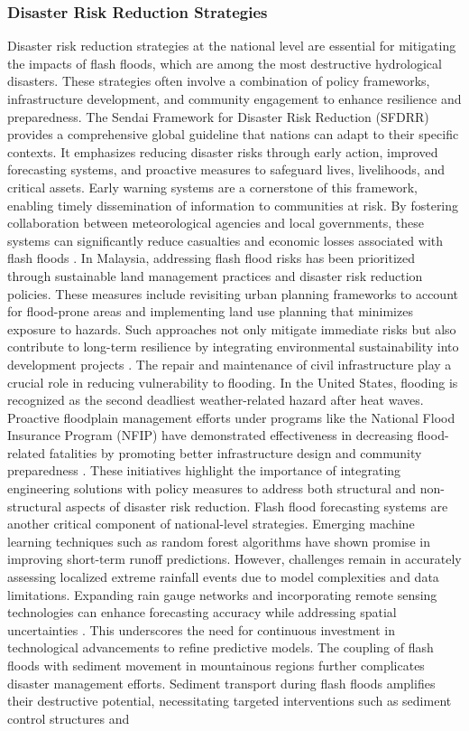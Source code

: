 \subsubsection{Disaster Risk Reduction Strategies}
Disaster risk reduction strategies at the national level are essential for mitigating the impacts of flash floods, which are among the most destructive hydrological disasters. These strategies often involve a combination of policy frameworks, infrastructure development, and community engagement to enhance resilience and preparedness. The Sendai Framework for Disaster Risk Reduction (SFDRR) provides a comprehensive global guideline that nations can adapt to their specific contexts. It emphasizes reducing disaster risks through early action, improved forecasting systems, and proactive measures to safeguard lives, livelihoods, and critical assets. Early warning systems are a cornerstone of this framework, enabling timely dissemination of information to communities at risk. By fostering collaboration between meteorological agencies and local governments, these systems can significantly reduce casualties and economic losses associated with flash floods \citep{Jubach2016}\citep{Munoz2018}. In Malaysia, addressing flash flood risks has been prioritized through sustainable land management practices and disaster risk reduction policies. These measures include revisiting urban planning frameworks to account for flood-prone areas and implementing land use planning that minimizes exposure to hazards. Such approaches not only mitigate immediate risks but also contribute to long-term resilience by integrating environmental sustainability into development projects \citep{Saad2024}. The repair and maintenance of civil infrastructure play a crucial role in reducing vulnerability to flooding. In the United States, flooding is recognized as the second deadliest weather-related hazard after heat waves. Proactive floodplain management efforts under programs like the National Flood Insurance Program (NFIP) have demonstrated effectiveness in decreasing flood-related fatalities by promoting better infrastructure design and community preparedness \citep{Abegaz2024}. These initiatives highlight the importance of integrating engineering solutions with policy measures to address both structural and non-structural aspects of disaster risk reduction. Flash flood forecasting systems are another critical component of national-level strategies. Emerging machine learning techniques such as random forest algorithms have shown promise in improving short-term runoff predictions. However, challenges remain in accurately assessing localized extreme rainfall events due to model complexities and data limitations. Expanding rain gauge networks and incorporating remote sensing technologies can enhance forecasting accuracy while addressing spatial uncertainties \citep{Munoz2018}. This underscores the need for continuous investment in technological advancements to refine predictive models. The coupling of flash floods with sediment movement in mountainous regions further complicates disaster management efforts. Sediment transport during flash floods amplifies their destructive potential, necessitating targeted interventions such as sediment control structures and 